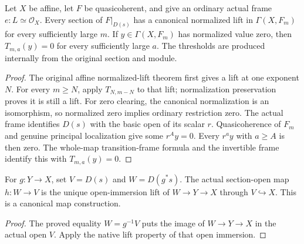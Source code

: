 \begin{lemma}
\label{lem:cech-line-native-affine-eventual}
\leanok
Let $X$ be affine, let $F$ be quasicoherent, and give an ordinary actual
frame $e:L\simeq\mathcal O_X$. Every section of $F|_{D(s)}$ has a
canonical normalized lift in $\Gamma(X,F_m)$ for every sufficiently
large $m$. If $y\in\Gamma(X,F_m)$ has normalized value zero, then
$T_{m,a}(y)=0$ for every sufficiently large $a$.
The thresholds are produced internally from the original section and module.
\end{lemma}
\begin{proof}
The original affine normalized-lift theorem first gives a lift at one
exponent $N$. For every $m\geq N$, apply $T_{N,m-N}$ to that lift;
normalization preservation proves it is still a lift.
For zero clearing, the canonical normalization is an isomorphism, so
normalized zero implies ordinary restriction zero. The actual frame
identifies $D(s)$ with the basic open of its scalar $r$.
Quasicoherence of $F_m$ and genuine principal localization give some
$r^A y=0$. Every $r^a y$ with $a\geq A$ is then zero. The whole-map
transition-frame formula and the invertible frame identify this with
$T_{m,a}(y)=0$.
\end{proof}

\begin{definition}
\label{def:cech-line-native-open-map}
\leanok
For $g:Y\to X$, set $V=D(s)$ and $W=D(g^*s)$. The actual section-open
map $h:W\to V$ is the unique open-immersion lift of $W\to Y\to X$
through $V\hookrightarrow X$. This is a canonical map construction.
\end{definition}
\begin{proof}
The proved equality $W=g^{-1}V$ puts the image of
$W\to Y\to X$ in the actual open $V$. Apply the native lift property
of that open immersion.
\end{proof}

